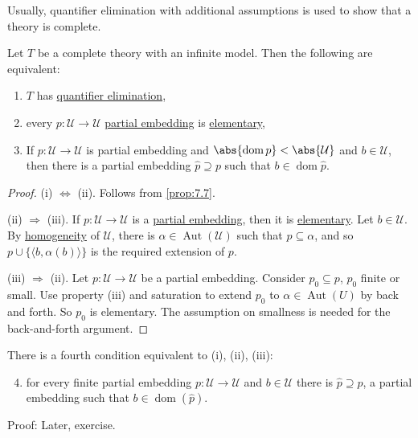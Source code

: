 \documentclass{article}
\DeclareMathOperator{\Aut}{Aut}
\DeclareMathOperator{\dom}{dom}
\DeclareMathOperator{\img}{img}
\begin{document}
\begin{remark}
Usually, quantifier elimination with additional assumptions is used to show that a theory is complete.
\end{remark}
\begin{nthm}
  Let $T$ be a complete theory with an infinite model. Then the following are equivalent:
  \begin{enumerate}[label=(\roman*)]
    \item $T$ has \hyperlink{def:qe}{quantifier elimination},
    \item every $p: \mathcal{U} \to \mathcal{U}$ \hyperlink{def:upe}{partial embedding} is \hyperlink{def:el}{elementary},
    \item If $p: \mathcal{U} \to \mathcal{U}$ is partial embedding and $\abs{\dom p} < \abs{\mathcal{U}}$ and $b \in \mathcal{U}$, then there is a partial embedding $\hat{p} \supseteq p$ such that $b \in \dom \hat{p}$.
  \end{enumerate}
\end{nthm}
\begin{proof}
  (i) $\Leftrightarrow$ (ii). Follows from \cref{prop:7.7}.

  (ii) $\Rightarrow$ (iii). If $p: \mathcal{U} \to \mathcal{U}$ is a \hyperlink{def:upe}{partial embedding}, then it is \hyperlink{def:elmap}{elementary}.
  Let $b \in \mathcal{U}$.
  By \hyperlink{def:homogeneous}{homogeneity} of $\mathcal{U}$, there is $\alpha \in \Aut(\mathcal{U})$ such that $p \subseteq \alpha$, and so $p \cup \{\langle b, \alpha(b) \rangle \}$ is the required extension of $p$.

  (iii) $\Rightarrow$ (ii). Let $p: \mathcal{U} \to \mathcal{U}$ be a partial embedding.
  Consider $p_0 \subseteq p$, $p_0$ finite or small. Use property (iii) and saturation to extend $p_0$ to $\alpha \in \Aut(U)$ by back and forth.
  So $p_0$ is elementary. The assumption on smallness is needed for the back-and-forth argument.
\end{proof}
\begin{remark}
  There is a fourth condition equivalent to (i), (ii), (iii):
  \begin{enumerate}[label=(\roman*)]\setcounter{enumi}{3}
    \item for every finite partial embedding $p: \mathcal{U} \to \mathcal{U}$ and $b \in \mathcal{U}$ there is $\hat{p} \supseteq p$, a partial embedding such that $b \in \dom(\hat{p})$.
  \end{enumerate}

  Proof: Later, exercise.
\end{remark}
\end{document}
